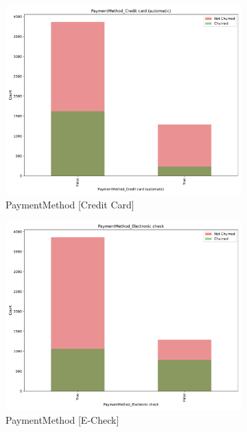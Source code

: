 \documentclass[a4paper,11pt]{article}
\begin{document}
\begin{landscape}
\begin{figure}
\begin{subfigure}{0.14\linewidth}
    \includegraphics[width=\linewidth]{figures/understanding/PaymentMethod_Credit card (automatic).pdf}
    \caption{PaymentMethod [Credit Card]}
\end{subfigure}
\begin{subfigure}{0.14\linewidth}
    \includegraphics[width=\linewidth]{figures/understanding/PaymentMethod_Electronic check.pdf}
    \caption{PaymentMethod [E-Check]}
\end{subfigure}
\begin{subfigure}{0.14\linewidth}

\end{subfigure}
\end{figure}
\end{landscape}
\end{document}
